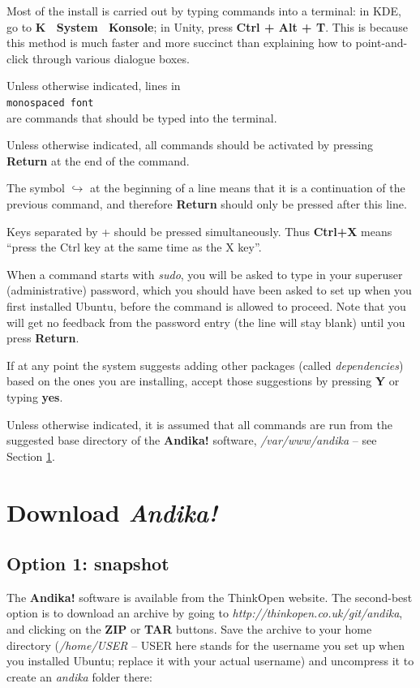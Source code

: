 Most of the install is carried out by typing commands into a terminal: in KDE, go to \textbf{K \textrightarrow\ System \textrightarrow\ Konsole}; in Unity, press \textbf{Ctrl + Alt + T}.  This is because this method is much faster and more succinct than explaining how to point-and-click through various dialogue boxes.

Unless otherwise indicated, lines in\\
\texttt{monospaced font}\\
are commands that should be typed into the terminal.  

Unless otherwise indicated, all commands should be activated by pressing \textbf{Return} at the end of the command.

The symbol $\hookrightarrow$ at the beginning of a line means that it is a continuation of the previous command, and therefore \textbf{Return} should only be pressed after this line.

Keys separated by + should be pressed simultaneously.  Thus \textbf{Ctrl+X} means ``press the Ctrl key at the same time as the X key''.

When a command starts with \textit{sudo}, you will be asked to type in your superuser (administrative) password, which you should have been asked to set up when you first installed Ubuntu, before the command is allowed to proceed.  Note that you will get no feedback from the password entry (the line will stay blank) until you press \textbf{Return}.

If at any point the system suggests adding other packages (called \textit{dependencies}) based on the ones you are installing, accept those suggestions by pressing \textbf{Y} or typing \textbf{yes}.

Unless otherwise indicated, it is assumed that all commands are run from the suggested base directory of the \textbf{Andika!} software, \textit{/var/www/andika} -- see Section \ref{s:download}.


\section{Download \textit{Andika!}}
\label{s:download}

\subsection{Option 1: snapshot}
\label{s:snapshot}

The \textbf{Andika!} software is available from the ThinkOpen website.  The second-best option is to download an archive by going to \textit{http://thinkopen.co.uk/git/andika}, and clicking on the \textbf{ZIP} or \textbf{TAR} buttons.  Save the archive to your home directory (\textit{/home/USER} -- USER here stands for the username you set up when you installed Ubuntu; replace it with your actual username) and uncompress it to create an \textit{andika} folder there:

